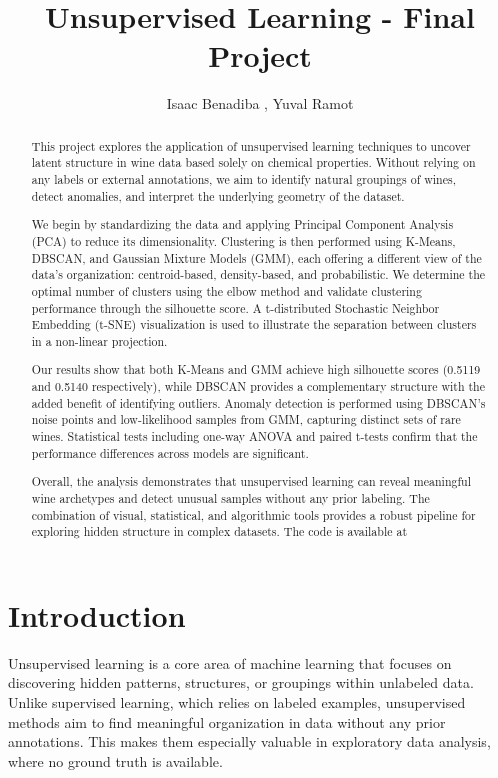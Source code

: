 \documentclass[12pt]{article}
\title{Unsupervised Learning - Final Project}
\author{Isaac Benadiba , Yuval Ramot }
\begin{document}
\maketitle

\begin{abstract}
This project explores the application of unsupervised learning techniques to uncover latent structure in wine data based solely on chemical properties. Without relying on any labels or external annotations, we aim to identify natural groupings of wines, detect anomalies, and interpret the underlying geometry of the dataset.

We begin by standardizing the data and applying Principal Component Analysis (PCA) to reduce its dimensionality. Clustering is then performed using K-Means, DBSCAN, and Gaussian Mixture Models (GMM), each offering a different view of the data’s organization: centroid-based, density-based, and probabilistic. We determine the optimal number of clusters using the elbow method and validate clustering performance through the silhouette score. A t-distributed Stochastic Neighbor Embedding (t-SNE) visualization is used to illustrate the separation between clusters in a non-linear projection.

Our results show that both K-Means and GMM achieve high silhouette scores (0.5119 and 0.5140 respectively), while DBSCAN provides a complementary structure with the added benefit of identifying outliers. Anomaly detection is performed using DBSCAN’s noise points and low-likelihood samples from GMM, capturing distinct sets of rare wines. Statistical tests including one-way ANOVA and paired t-tests confirm that the performance differences across models are significant.

Overall, the analysis demonstrates that unsupervised learning can reveal meaningful wine archetypes and detect unusual samples without any prior labeling. The combination of visual, statistical, and algorithmic tools provides a robust pipeline for exploring hidden structure in complex datasets.
The code is available at  %
\end{abstract}


\section{Introduction}

Unsupervised learning is a core area of machine learning that focuses on discovering hidden patterns, structures, or groupings within unlabeled data. Unlike supervised learning, which relies on labeled examples, unsupervised methods aim to find meaningful organization in data without any prior annotations. This makes them especially valuable in exploratory data analysis, where no ground truth is available.
\end{document}

